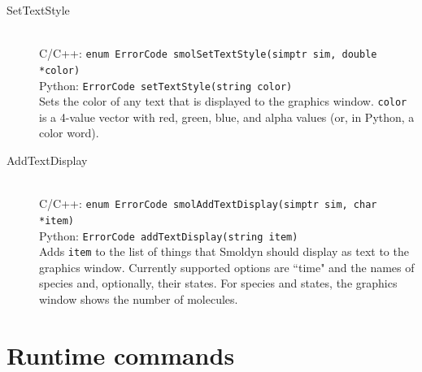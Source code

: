 \documentclass {book}
\newcommand {\ttt} {\texttt}
\begin{document}
\begin{description}
\item[SetTextStyle]
\hfill \\
C/C++: \ttt{enum ErrorCode smolSetTextStyle(simptr sim, double *color)}\\
Python: \ttt{ErrorCode setTextStyle(string color)}\\
Sets the color of any text that is displayed to the graphics window. \ttt{color} is a 4-value vector with red, green, blue, and alpha values (or, in Python, a color word).

\item[AddTextDisplay]
\hfill \\
C/C++: \ttt{enum ErrorCode smolAddTextDisplay(simptr sim, char *item)}\\
Python: \ttt{ErrorCode addTextDisplay(string item)}\\
Adds \ttt{item} to the list of things that Smoldyn should display as text to the graphics window. Currently supported options are ``time" and the names of species and, optionally, their states. For species and states, the graphics window shows the number of molecules.

\end{description}

\section{Runtime commands}
\end{document}
